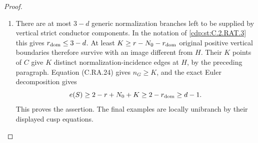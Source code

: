 \begin{proof}
\begin{enumerate}[label={$\langle1\rangle$\arabic*.},leftmargin=*]
\item There are at most $3-d$ generic normalization branches
left to be supplied by vertical strict conductor
components. In the notation of \ref{cdp:st:C.2.RAT.3} this gives
$r_{\rm dom}\le3-d$. At least
$K\ge r-N_0-r_{\rm dom}$ original positive vertical
boundaries therefore survive with an image different
from $H$. Their $K$ points of $C$ give $K$ distinct
normalization-incidence edges at $H$, by the preceding
paragraph. Equation (C.RA.24) gives $n_G\ge K$, and
the exact Euler decomposition gives
\[
 e(S)\ge2-r+N_0+K
       \ge2-r_{\rm dom}\ge d-1.
\]
This proves the assertion. The final examples are locally
unibranch by their displayed cusp equations.

\end{enumerate}
\end{proof}
